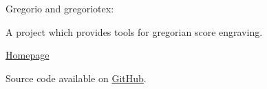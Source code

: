 \documentclass[12pt]{article}
\begin{document}
\begin{titlepage}
  \begin{center}
    \Huge
    \textcolor{myred}{Gregorio} and \textcolor{myred}{gregoriotex}:

    A project which provides tools for gregorian score engraving.

    \vspace{1cm}\large\href{http://home.gna.org/gregorio/}{Homepage}

    Source code available on
    \href{http://github.com/gregorio-project/gregorio}{GitHub}.
  \end{center}
  \vspace{2cm}
  \begin{multicols}{2}
    \tableofcontents
  \end{multicols}
\end{titlepage}


% 


\printindex
\end{document}
